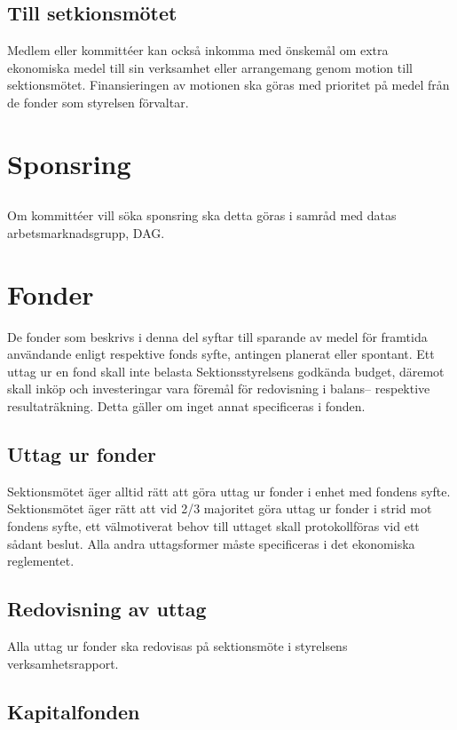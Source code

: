 \documentclass[a4paper, 10pt]{article}
\begin{document}
\subsection{Till setkionsmötet}
Medlem eller kommittéer kan också inkomma med önskemål om extra ekonomiska medel till sin verksamhet eller arrangemang genom motion till sektionsmötet. Finansieringen av motionen ska göras med prioritet på medel från de fonder som styrelsen förvaltar.

\section{Sponsring}
\subsection{}
Om kommittéer vill söka sponsring ska detta göras i samråd med datas arbetsmarknadsgrupp, DAG.

\section{Fonder}
De fonder som beskrivs i denna del syftar till sparande av medel för framtida användande enligt respektive fonds syfte, antingen planerat eller spontant. Ett uttag ur en fond skall inte belasta Sektionsstyrelsens godkända budget, däremot skall inköp och investeringar vara föremål för redovisning i balans– respektive resultaträkning. Detta gäller om inget annat specificeras i fonden.

\subsection{Uttag ur fonder}
Sektionsmötet äger alltid rätt att göra uttag ur fonder i enhet med fondens syfte. Sektionsmötet äger rätt att vid 2/3 majoritet göra uttag ur fonder i strid mot fondens syfte, ett välmotiverat behov till uttaget skall protokollföras vid ett sådant beslut. Alla andra uttagsformer måste specificeras i det ekonomiska reglementet.

\subsection{Redovisning av uttag}
Alla uttag ur fonder ska redovisas på sektionsmöte i styrelsens verksamhetsrapport.

\subsection{Kapitalfonden}
\end{document}
